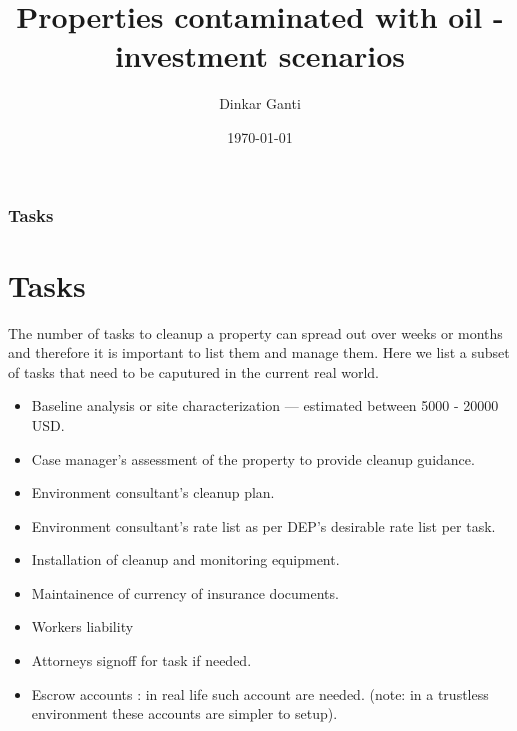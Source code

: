 \documentclass{beamer}
\title{Properties contaminated with oil - investment scenarios}
\author{Dinkar Ganti}
\date {\today}
\begin{document}
\begin{frame}
  \titlepage
\end{frame}
\begin{frame}
\frametitle{Tasks}
\section{Tasks}
  The number of tasks to cleanup a property can spread out over weeks or months and therefore it is important to list them and manage them. Here we list a subset of tasks that need to be caputured in the current real world.
  \begin{itemize}
    \item Baseline analysis or site characterization --- estimated between 5000 - 20000 USD.
    \item Case manager's assessment of the property to provide cleanup guidance.
    \item Environment consultant's cleanup plan.
    \item Environment consultant's rate list as per DEP's desirable rate list per task. 
    \item Installation of cleanup and monitoring equipment.
    \item Maintainence of currency of insurance documents.
    \item Workers liability
    \item Attorneys signoff for task if needed.
    \item Escrow accounts : in real life such account are needed. (note: in a trustless environment these accounts are simpler to setup).
  \end{itemize}
\end{frame}
\end{document}
